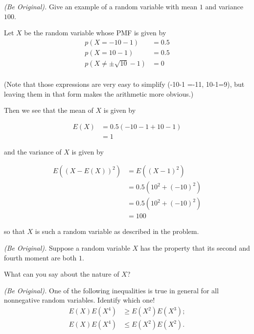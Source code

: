 \begin{problem}[Handout 7, \# 11]
  \emph{(Be Original).} Give an example of a random variable with mean
  \(1\) and variance \(100\).
\end{problem}
\begin{solution}
Let $X$ be the random variable whose PMF is given by
\begin{align*}
p(X = -10-1) &= 0.5\\
p(X = 10-1) &= 0.5\\
p(X \neq \pm \sqrt{10}-1) &= 0\\
\end{align*}

(Note that those expressions are very easy to simplify (-10-1 =-11, 10-1=9), but leaving them in that form makes the arithmetic more obvious.)

Then we see that the mean of $X$ is given by

\begin{align*}
E(X) &= 0.5 (-10-1 +10-1)\\
&= 1
\end{align*}

and the variance of $X$ is given by

\begin{align*}
E((X-E(X))^2) &= E((X-1)^2) \\
&= 0.5 (10^2 + (-10)^2) \\
&= 0.5 (10^2 + (-10)^2) \\
&= 100
\end{align*}

so that $X$ is such a random variable as described in the problem.
\end{solution}
\newpage

\begin{problem}[Handout 7, \# 13]
  \emph{(Be Original).} Suppose a random variable \(X\) has the property
  that its second and fourth moment are both \(1\).

  What can you say about the nature of \(X\)?
\end{problem}
\begin{solution}

\end{solution}
\newpage

\begin{problem}[Handout 7, \# 14]
  \emph{(Be Original).} One of the following inequalities is true in
  general for all nonnegative random variables. Identify which one!
  \begin{align*}
    E(X)E(X^4)&\geq E(X^2)E(X^3);\\
    E(X)E(X^4)&\leq E(X^2)E(X^2).
  \end{align*}
\end{problem}
\begin{solution}

\end{solution}
\newpage

